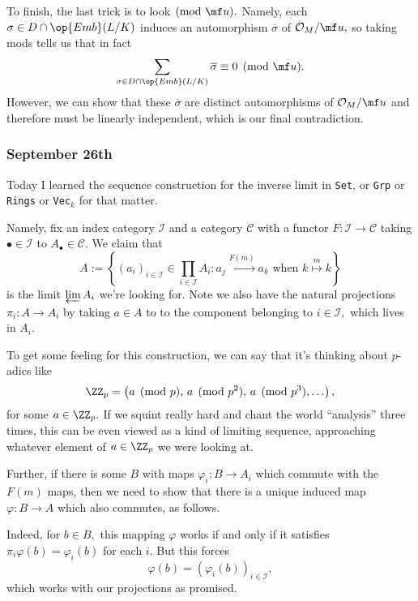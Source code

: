 To finish, the last trick is to look$\pmod{\mf u}.$ Namely, each $\sigma\in D\cap\op{Emb}(L/K)$ induces an automorphism $\overline\sigma$ of $\mathcal O_M/\mf u,$ so taking mods tells us that in fact
\[\sum_{\sigma\in D\cap\op{Emb}(L/K)}\overline\sigma\equiv0\pmod{\mf u}.\]
However, we can show that these $\overline\sigma$ are distinct automorphisms of $\mathcal O_M/\mf u$ and therefore must be linearly independent, which is our final contradiction.

\subsubsection{September 26th}
Today I learned the sequence construction for the inverse limit in \texttt{Set}, or \texttt{Grp} or \texttt{Rings} or \texttt{Vec}$_k$ for that matter.

Namely, fix an index category $\mathcal I$ and a category $\mathcal C$ with a functor $F:\mathcal I\to\mathcal C$ taking $\bullet\in\mathcal I$ to $A_\bullet\in\mathcal C.$ We claim that
\[A:=\left\{(a_i)_{i\in\mathcal I}\in\prod_{i\in\mathcal I}A_i:a_j\stackrel{F(m)}\longmapsto a_k\text{ when }k\stackrel m\longmapsto k\right\}\]
is the limit $\varprojlim A_i$ we're looking for. Note we also have the natural projections $\pi_i:A\to A_i$ by taking $a\in A$ to to the component belonging to $i\in\mathcal I,$ which lives in $A_i.$

To get some feeling for this construction, we can say that it's thinking about $p$-adics like
\[\ZZ_p=\left(a\pmod p,\,a\pmod{p^2},\,a\pmod{p^3},\ldots\right),\]
for some $a\in\ZZ_p.$ If we squint really hard and chant the world ``analysis'' three times, this can be even viewed as a kind of limiting sequence, approaching whatever element of $a\in\ZZ_p$ we were looking at.

Further, if there is some $B$ with maps $\varphi_i:B\to A_i$ which commute with the $F(m)$ maps, then we need to show that there is a unique induced map $\varphi:B\to A$ which also commutes, as follows.
\begin{center}
\end{center}
Indeed, for $b\in B,$ this mapping $\varphi$ works if and only if it satisfies $\pi_i\varphi(b)=\varphi_i(b)$ for each $i.$ But this forces
\[\varphi(b)=(\varphi_i(b))_{i\in\mathcal I},\]
which works with our projections as promised.

